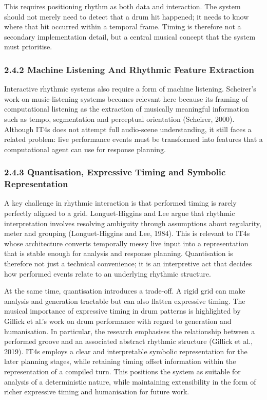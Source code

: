 This requires positioning rhythm as both data and interaction. The
system should not merely need to detect that a drum hit happened; it
needs to know where that hit occurred within a temporal frame. Timing is
therefore not a secondary implementation detail, but a central musical
concept that the system must prioritise.

\subsubsection{2.4.2 Machine Listening And Rhythmic Feature
Extraction}\label{machine-listening-and-rhythmic-feature-extraction}

Interactive rhythmic systems also require a form of machine listening.
Scheirer's work on music-listening systems becomes relevant here because
its framing of computational listening as the extraction of musically
meaningful information such as tempo, segmentation and perceptual
orientation (Scheirer, 2000). Although IT4s does not attempt full
audio-scene understanding, it still faces a related problem: live
performance events must be transformed into features that a
computational agent can use for response planning.

\subsubsection{2.4.3 Quantisation, Expressive Timing and Symbolic
Representation}\label{quantisation-expressive-timing-and-symbolic-representation}

A key challenge in rhythmic interaction is that performed timing is
rarely perfectly aligned to a grid. Longuet-Higgins and Lee argue that
rhythmic interpretation involves resolving ambiguity through assumptions
about regularity, meter and grouping (Longuet-Higgins and Lee, 1984).
This is relevant to IT4s whose architecture converts temporally messy
live input into a representation that is stable enough for analysis and
response planning. Quantisation is therefore not just a technical
convenience; it is an interpretive act that decides how performed events
relate to an underlying rhythmic structure.

At the same time, quantisation introduces a trade-off. A rigid grid can
make analysis and generation tractable but can also flatten expressive
timing. The musical importance of expressive timing in drum patterns is
highlighted by Gillick et al.'s work on drum performance with regard to
generation and humanisation. In particular, the research emphasises the
relationship between a performed groove and an associated abstract
rhythmic structure (Gillick et al., 2019). IT4s employs a clear and
interpretable symbolic representation for the later planning stages,
while retaining timing offset information within the representation of a
compiled turn. This positions the system as suitable for analysis of a
deterministic nature, while maintaining extensibility in the form of
richer expressive timing and humanisation for future work.

